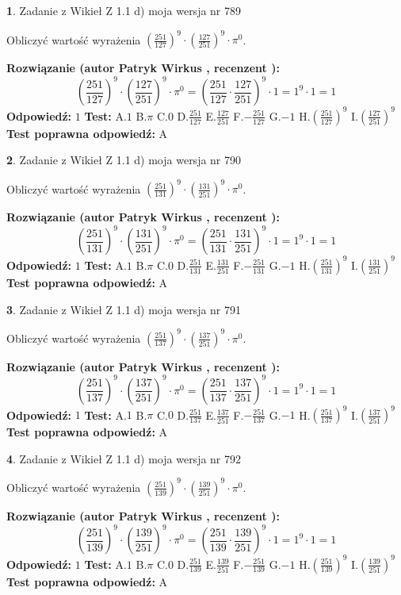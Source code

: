 \documentclass[12pt, a4paper]{article}
\theoremstyle{definition} %
\newtheorem{zad}{}
\newcommand{\zadStart}[1]{\begin{zad}#1\newline}
\newcommand{\zadStop}{\end{zad}}
\newcommand{\rozwStart}[2]{\noindent \textbf{Rozwiązanie (autor #1 , recenzent #2): }\newline}
\newcommand{\rozwStop}{\newline}
\newcommand{\odpStart}{\noindent \textbf{Odpowiedź:}\newline}
\newcommand{\odpStop}{\newline}
\newcommand{\testStart}{\noindent \textbf{Test:}\newline}
\newcommand{\testStop}{\newline}
\newcommand{\kluczStart}{\noindent \textbf{Test poprawna odpowiedź:}\newline}
\newcommand{\kluczStop}{\newline}
\begin{document}
\zadStart{Zadanie z Wikieł Z 1.1 d) moja wersja nr 789}

Obliczyć wartość wyrażenia $(\frac{251}{127})^{9} \cdot (\frac{127}{251})^{9} \cdot \pi^{0}$.
\zadStop
\rozwStart{Patryk Wirkus}{}
$$(\frac{251}{127})^{9} \cdot (\frac{127}{251})^{9} \cdot \pi^{0} = (\frac{251}{127} \cdot \frac{127}{251})^{9} \cdot 1 = 1^{9} \cdot 1 = 1$$
\rozwStop
\odpStart
$1$
\odpStop
\testStart
A.$1$ B.$\pi$ C.$0$ D.$\frac{251}{127}$ E.$\frac{127}{251}$
F.$-\frac{251}{127}$ G.$-1$
H.$(\frac{251}{127})^{9}$
I.$(\frac{127}{251})^{9}$
\testStop
\kluczStart
A
\kluczStop



\zadStart{Zadanie z Wikieł Z 1.1 d) moja wersja nr 790}

Obliczyć wartość wyrażenia $(\frac{251}{131})^{9} \cdot (\frac{131}{251})^{9} \cdot \pi^{0}$.
\zadStop
\rozwStart{Patryk Wirkus}{}
$$(\frac{251}{131})^{9} \cdot (\frac{131}{251})^{9} \cdot \pi^{0} = (\frac{251}{131} \cdot \frac{131}{251})^{9} \cdot 1 = 1^{9} \cdot 1 = 1$$
\rozwStop
\odpStart
$1$
\odpStop
\testStart
A.$1$ B.$\pi$ C.$0$ D.$\frac{251}{131}$ E.$\frac{131}{251}$
F.$-\frac{251}{131}$ G.$-1$
H.$(\frac{251}{131})^{9}$
I.$(\frac{131}{251})^{9}$
\testStop
\kluczStart
A
\kluczStop



\zadStart{Zadanie z Wikieł Z 1.1 d) moja wersja nr 791}

Obliczyć wartość wyrażenia $(\frac{251}{137})^{9} \cdot (\frac{137}{251})^{9} \cdot \pi^{0}$.
\zadStop
\rozwStart{Patryk Wirkus}{}
$$(\frac{251}{137})^{9} \cdot (\frac{137}{251})^{9} \cdot \pi^{0} = (\frac{251}{137} \cdot \frac{137}{251})^{9} \cdot 1 = 1^{9} \cdot 1 = 1$$
\rozwStop
\odpStart
$1$
\odpStop
\testStart
A.$1$ B.$\pi$ C.$0$ D.$\frac{251}{137}$ E.$\frac{137}{251}$
F.$-\frac{251}{137}$ G.$-1$
H.$(\frac{251}{137})^{9}$
I.$(\frac{137}{251})^{9}$
\testStop
\kluczStart
A
\kluczStop



\zadStart{Zadanie z Wikieł Z 1.1 d) moja wersja nr 792}

Obliczyć wartość wyrażenia $(\frac{251}{139})^{9} \cdot (\frac{139}{251})^{9} \cdot \pi^{0}$.
\zadStop
\rozwStart{Patryk Wirkus}{}
$$(\frac{251}{139})^{9} \cdot (\frac{139}{251})^{9} \cdot \pi^{0} = (\frac{251}{139} \cdot \frac{139}{251})^{9} \cdot 1 = 1^{9} \cdot 1 = 1$$
\rozwStop
\odpStart
$1$
\odpStop
\testStart
A.$1$ B.$\pi$ C.$0$ D.$\frac{251}{139}$ E.$\frac{139}{251}$
F.$-\frac{251}{139}$ G.$-1$
H.$(\frac{251}{139})^{9}$
I.$(\frac{139}{251})^{9}$
\testStop
\kluczStart
A
\kluczStop
\end{document}
